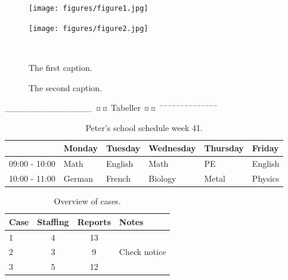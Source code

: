 \begin{figure}[H] %
	\centering
	\begin{minipage}[b]{0.48\textwidth}
	\centering
	\texttt{[image: figures/figure1.jpg]} %
	\end{minipage}
	\hfill
	\begin{minipage}[b]{0.48\textwidth}
	\centering
	\texttt{[image: figures/figure2.jpg]} %
	\end{minipage}
	\\ %
	\begin{minipage}[t]{0.48\textwidth}
	\caption{The first caption.}%
	\label{fig:billede1}
	\end{minipage}
	\hfill
	\begin{minipage}[t]{0.48\textwidth}
	\caption{The second caption.} %
	\label{fig:billede2}
	\end{minipage}
\end{figure}

______________
¤¤ Tabeller ¤¤
¯¯¯¯¯¯¯¯¯¯¯¯¯¯
\begin{table}[H] 
	\centering 
	\begin{tabular}{|l|l|l|l|l|l|} %
		\hline 	%
					  & Monday & Tuesday & Wednesday & Thursday & Friday  \\ \hline 	%
		09:00 - 10:00 & Math   & English & Math      & PE       & English \\ \hline 
		10:00 - 11:00 & German & French  & Biology   & Metal    & Physics \\ \hline 
	\end{tabular} 
	\caption{Peter's school schedule week 41.} 
	\label{tab:skoleskema} 
\end{table}

\begin{table}[H]
	\centering
	\begin{tabular}{lccl} %
		\toprule
		Case & Staffing & Reports & Notes \\\midrule
		1 & 4 & 13 &              \\
		2 & 3 & 9  & Check notice \\
		3 & 5 & 12 &              \\
		\bottomrule
	\end{tabular}
	\caption{Overview of cases.}
	\label{tab:cases}
\end{table}

